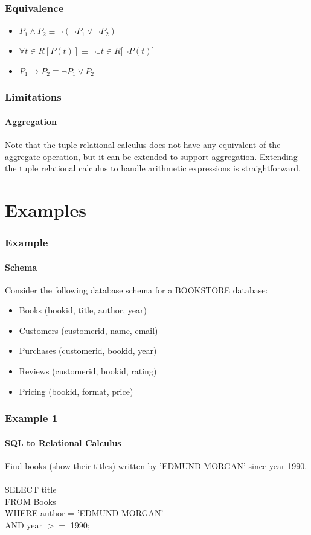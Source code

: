 \documentclass{beamer}
\begin{document}
\begin{frame}
  \frametitle{Equivalence}
  \begin{itemize}
  \item $P_1 \wedge P_2 \equiv \neg (\neg P_1 \vee \neg P_2)$
  \item $\forall t \in R[P(t)] \equiv \neg \exists t \in R [\neg P(t)$]
  \item $P_1 \rightarrow P_2 \equiv \neg P_1 \vee P_2$
  \end{itemize}
\end{frame}

\begin{frame}
  \frametitle{Limitations}
  \framesubtitle{Aggregation}
  Note that the tuple relational calculus does not have any equivalent of the aggregate operation, but it can be extended to support aggregation. Extending the tuple relational calculus to handle arithmetic expressions is straightforward.
\end{frame}

\section{Examples}
\begin{frame}
  \frametitle{Example}
    \framesubtitle{Schema}
Consider the following database schema for a BOOKSTORE database:
\begin{itemize}
\item Books (bookid, title, author, year)
\item Customers (customerid, name, email)
\item Purchases (customerid, bookid, year)
\item Reviews (customerid, bookid, rating)
\item Pricing (bookid, format, price)
\end{itemize}
\end{frame}
\begin{frame}
  \frametitle{Example 1}
    \framesubtitle{SQL to Relational Calculus}
  Find books (show their titles) written by 'EDMUND MORGAN' since year 1990.\\
  \hfill \\  
  SELECT title\\
  FROM Books\\
  WHERE author = 'EDMUND MORGAN'\\
  AND year $>=$ 1990;\\
\end{frame}
\end{document}
